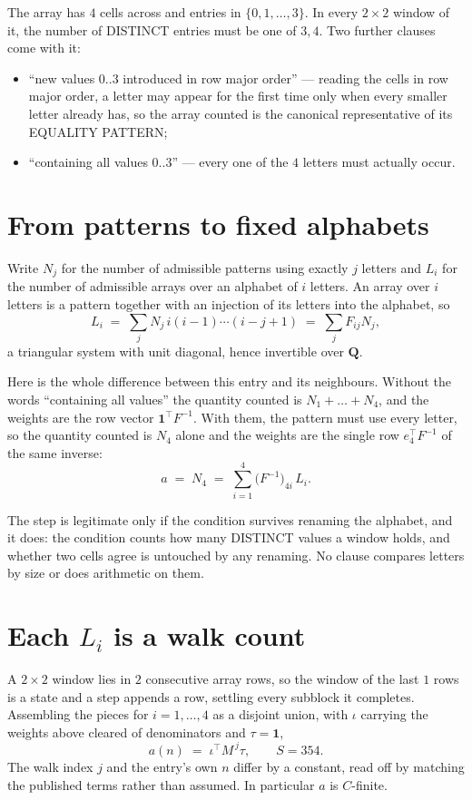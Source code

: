 \documentclass[11pt,a4paper]{article}
\theoremstyle{plain}
\theoremstyle{definition}
\begin{document}
The array has $4$ cells across and entries in $\{0,1,\dots,3\}$. In every
$2\times2$ window of it, the number of DISTINCT entries must be one of $3, 4$. Two
further clauses come with it:

\begin{itemize}
\item ``new values $0..3$ introduced in row major order'' --- reading the cells in row major
order, a letter may appear for the first time only when every smaller letter already has, so
the array counted is the canonical representative of its EQUALITY PATTERN;
\item ``containing all values $0..3$'' --- every one of the $4$ letters must actually
occur.
\end{itemize}


\section{From patterns to fixed alphabets}

Write $N_j$ for the number of admissible patterns using exactly $j$ letters and $L_i$ for the
number of admissible arrays over an alphabet of $i$ letters. An array over $i$ letters is a
pattern together with an injection of its letters into the alphabet, so
\[
L_i\;=\;\sum_{j} N_j\,i(i-1)\cdots(i-j+1)\;=\;\sum_j F_{ij}N_j ,
\]
a triangular system with unit diagonal, hence invertible over $\mathbf{Q}$.

Here is the whole difference between this entry and its neighbours. Without the words
``containing all values'' the quantity counted is $N_1+\dots+N_{4}$, and the weights are
the row vector $\mathbf{1}^{\!\top}F^{-1}$. With them, the pattern must use every letter,
so the quantity counted is $N_{4}$ alone and the weights are the single row
$e_{4}^{\!\top}F^{-1}$ of the same inverse:
\[
a\;=\;N_{4}\;=\;\sum_{i=1}^{4}\bigl(F^{-1}\bigr)_{4i}\,L_i .
\]

The step is legitimate only if the condition survives renaming the alphabet, and it does: the
condition counts how many DISTINCT values a window holds, and whether two cells agree is
untouched by any renaming. No clause compares letters by size or does arithmetic on them.

\section{Each $L_i$ is a walk count}

A $2\times2$ window lies in $2$ consecutive array rows, so the window of the last
$1$ rows is a state and a step appends a row, settling every subblock it completes.
Assembling the pieces for $i=1,\dots,4$ as a disjoint union, with $\iota$ carrying the
weights above cleared of denominators and $\tau=\mathbf{1}$,
\[
a(n)\;=\;\iota^{\!\top}M^{\,j}\tau ,\qquad S=354.
\]
The walk index $j$ and the entry's own $n$ differ by a constant, read off by matching the
published terms rather than assumed. In particular $a$ is $C$-finite.
\end{document}
